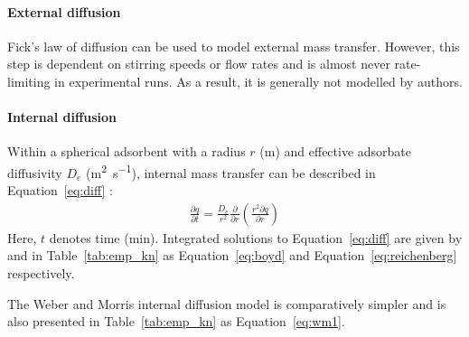 \paragraph{External diffusion} Fick's law of  diffusion can be used to model external mass transfer. However, this step is dependent on stirring speeds or flow rates and is almost never rate-limiting in experimental runs. As a result, it is generally not modelled by authors. 

\paragraph{Internal diffusion} Within a spherical adsorbent with a radius $ r $ (\si{\meter}) and effective adsorbate diffusivity $ D_e $ (\si{\meter\squared\per\second}), internal mass transfer can be described in Equation~\ref{eq:diff} \parencite{Largitte2016}:
\begin{align}
	\frac{\partial q}{\partial t} = \frac{D_e}{r^2} \frac{\partial}{\partial r} \left( \frac{r^2 \partial q}{\partial r} \right) \label{eq:diff}
\end{align}
Here, $ t $ denotes time (\si{\minute}). Integrated solutions to Equation~\ref{eq:diff} are given by \parencite{Boyd1947} and \parencite{Reichenberg1953} in Table~\ref{tab:emp_kn}  as Equation~\ref{eq:boyd} and Equation~\ref{eq:reichenberg} respectively. 

The Weber and Morris internal diffusion model is comparatively simpler and is also presented in Table~\ref{tab:emp_kn} as Equation~\ref{eq:wm1}.


